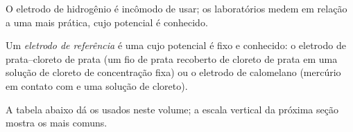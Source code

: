 O eletrodo de hidrogênio é incômodo de usar; os laboratórios medem em
relação a uma  mais prática, cujo potencial é conhecido.

\begin{definition}\label{def:b1:nernst:reference-electrode}
Um \emph{eletrodo de referência} é uma
 cujo potencial é fixo e conhecido: o eletrodo de
prata--cloreto de prata (um fio de prata recoberto de cloreto de prata
em uma solução de cloreto de concentração fixa) ou o eletrodo de
calomelano (mercúrio em contato com  e uma solução de
cloreto).
\end{definition}

A tabela abaixo dá os  usados neste volume; a escala
vertical da próxima seção mostra os mais comuns.


